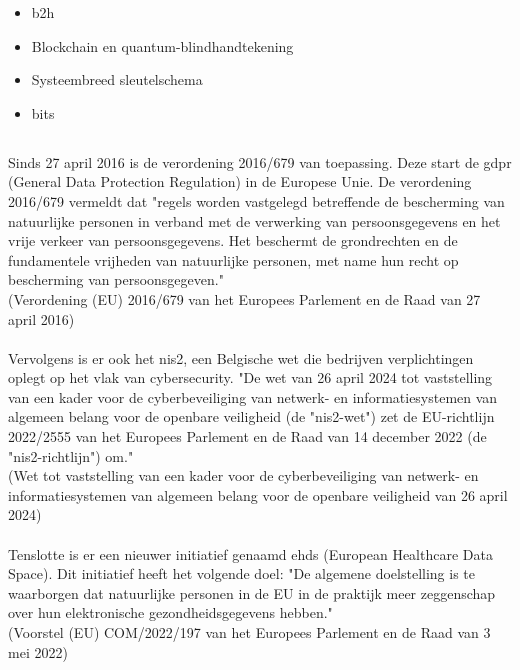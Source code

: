 \begin{itemize}
  \item \gls{b2h} \autocite{Ghosh2022}
  \item Blockchain en quantum-blindhandtekening \autocite{Bhavin2021}
  \item Systeembreed sleutelschema \autocite{Chang2022}
  \item \gls{bits} \autocite{Gupta2020}
\end{itemize}
\subsection{}%
\label{sec:wet}%


Sinds 27 april 2016 is de verordening 2016/679 van toepassing. Deze start de \gls{gdpr} (General Data Protection Regulation) in de Europese Unie. De verordening 2016/679 vermeldt dat "regels worden vastgelegd betreffende de bescherming van natuurlijke personen in verband met de verwerking van persoonsgegevens en het vrije verkeer van persoonsgegevens. Het beschermt de grondrechten en de fundamentele vrijheden van natuurlijke personen, met name hun recht op bescherming van persoonsgegeven."\\ (Verordening (EU) 2016/679 van het Europees Parlement en de Raad van 27 april 2016) %
\\\\
Vervolgens is er ook het \gls{nis2}, een Belgische wet die bedrijven verplichtingen oplegt op het vlak van cybersecurity. "De wet van 26 april 2024 tot vaststelling van een kader voor de cyberbeveiliging van netwerk- en informatiesystemen van algemeen belang voor de openbare veiligheid (de "\gls{nis2}-wet") zet de EU-richtlijn 2022/2555 van het Europees Parlement en de Raad van 14 december 2022 (de "\gls{nis2}-richtlijn") om." \\
(Wet tot vaststelling van een kader voor de cyberbeveiliging van netwerk- en informatiesystemen van algemeen belang voor de openbare veiligheid van 26 april 2024) %
\\\\
Tenslotte is er een nieuwer initiatief genaamd \gls{ehds} (European Healthcare Data Space). Dit initiatief heeft het volgende doel: "De algemene doelstelling is te waarborgen dat natuurlijke personen in de EU in de praktijk meer zeggenschap over hun elektronische gezondheidsgegevens hebben."\\ (Voorstel (EU) COM/2022/197 van het Europees Parlement en de Raad van 3 mei 2022) %
